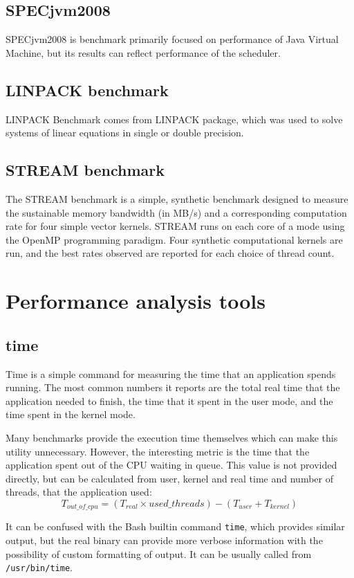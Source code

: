 \subsection{SPECjvm2008}
SPECjvm2008 is benchmark primarily focused on performance of Java Virtual
Machine, but its results can reflect performance of the scheduler.

\subsection{LINPACK benchmark}
LINPACK Benchmark\cite{linpack} comes from LINPACK package, which was used to solve systems of linear equations in single or double precision.

\subsection{STREAM benchmark}
The STREAM benchmark is a simple, synthetic benchmark designed to measure the sustainable memory bandwidth (in MB/s) and a corresponding computation rate for four simple vector kernels.
STREAM runs on each core of a mode using the OpenMP programming paradigm. Four synthetic computational kernels are run, and the best rates observed are reported for each choice of thread count.

\section{Performance analysis tools}

\subsection{time}
Time is a simple command for measuring the time that an application spends
running. The most common numbers it reports are the total real time that the
application needed to finish, the time that it spent in the user mode, and the
time spent in the kernel mode.

Many benchmarks provide the execution time themselves which can make this
utility unnecessary. However, the interesting metric is the time that the
application spent out of the CPU waiting in queue. This value is not provided
directly, but can be calculated from user, kernel and real time and number of
threads, that the application used:
$$T_{out\_of\_cpu} = (T_{real} \times used\_threads) - (T_{user} + T_{kernel})$$

It can be confused with the Bash builtin command \texttt{time}, which provides similar
output, but the real binary can provide more verbose information with
the possibility of custom formatting of output. It can be usually called from
\texttt{/usr/bin/time}.

